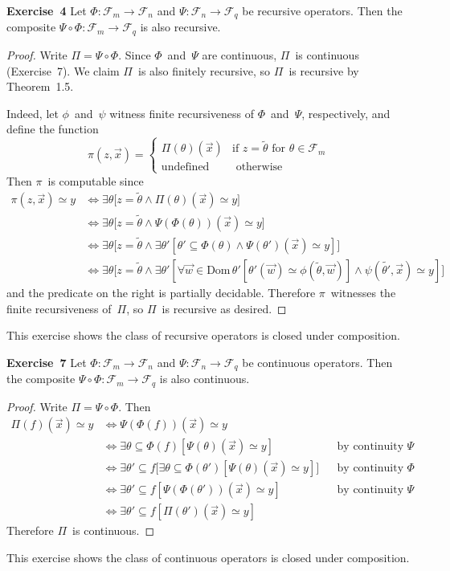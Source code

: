 \documentclass[letterpaper]{article}
\newcommand{\exercise}[2][]{\noindent\textbf{Exercise~{#2}}\ifthenelse{\isempty{#1}}{\textbf{.}}{ ({#1})\textbf{.}}}
\newcommand{\F}{\mathcal{F}}
\newcommand{\dom}{\mathrm{Dom}}
\newcommand{\code}[1]{\widetilde{{#1}}}
\theoremstyle{plain}
\theoremstyle{definition}
\theoremstyle{remark}
\begin{document}
\exercise{4}
Let $\Phi:\F_m\to\F_n$ and $\Psi:\F_n\to\F_q$ be recursive operators. Then the composite $\Psi\circ\Phi:\F_m\to\F_q$ is also recursive.
\begin{proof}
Write $\Pi=\Psi\circ\Phi$. Since $\Phi$~and~$\Psi$ are continuous, $\Pi$~is continuous (Exercise~7). We claim $\Pi$~is also finitely recursive, so $\Pi$~is recursive by Theorem~1.5.

Indeed, let $\phi$~and~$\psi$ witness finite recursiveness of $\Phi$~and~$\Psi$, respectively, and define the function
$$\pi(z,\vec{x})=\begin{cases}
\Pi(\theta)(\vec{x})&\text{if }z=\code{\theta}\text{ for }\theta\in\F_m\\
\text{undefined}&\text{ otherwise}
\end{cases}$$
Then $\pi$~is computable since
\begin{align*}
\pi(z,\vec{x})\simeq y&\iff \exists\theta\bigl[z=\code{\theta}\land \Pi(\theta)(\vec{x})\simeq y\bigr]\\
	&\iff \exists\theta\bigl[z=\code{\theta}\land \Psi(\Phi(\theta))(\vec{x})\simeq y\bigr]\\
	&\iff \exists\theta\bigl[z=\code{\theta}\land \exists\theta'[\theta'\subseteq\Phi(\theta)\land\Psi(\theta')(\vec{x})\simeq y]\bigr]\\
	&\iff \exists\theta\bigl[z=\code{\theta}\land \exists\theta'[\forall\vec{w}\in\dom\,\theta'[\theta'(\vec{w})\simeq\phi(\code{\theta},\vec{w})]\land\psi(\code{\theta'},\vec{x})\simeq y]\bigr]
\end{align*}
and the predicate on the right is partially decidable. Therefore $\pi$~witnesses the finite recursiveness of~$\Pi$, so $\Pi$~is recursive as desired.
\end{proof}
\noindent This exercise shows the class of recursive operators is closed under composition.

\bigskip
\exercise{7} Let $\Phi:\F_m\to\F_n$ and $\Psi:\F_n\to\F_q$ be continuous operators. Then the composite $\Psi\circ\Phi:\F_m\to\F_q$ is also continuous.
\begin{proof}
Write $\Pi=\Psi\circ\Phi$. Then
\begin{align*}
\Pi(f)(\vec{x})\simeq y&\iff\Psi(\Phi(f))(\vec{x})\simeq y&&\\
	&\iff \exists\theta\subseteq\Phi(f)[\Psi(\theta)(\vec{x})\simeq y]&&\text{by continuity of }\Psi\\
	&\iff \exists\theta'\subseteq f\bigl[\exists\theta\subseteq\Phi(\theta')[\Psi(\theta)(\vec{x})\simeq y]\bigr]&&\text{by continuity of }\Phi\\
	&\iff \exists\theta'\subseteq f[\Psi(\Phi(\theta'))(\vec{x})\simeq y]&&\text{by continuity of }\Psi\\
	&\iff \exists\theta'\subseteq f[\Pi(\theta')(\vec{x})\simeq y]&&
\end{align*}
Therefore $\Pi$~is continuous.
\end{proof}
\noindent This exercise shows the class of continuous operators is closed under composition.
\end{document}

